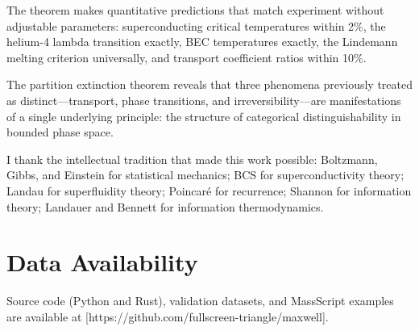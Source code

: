 \documentclass[twocolumn,10pt,aps,prd,superscriptaddress,nofootinbib]{revtex4-2}
\theoremstyle{remark}
\begin{document}
The theorem makes quantitative predictions that match experiment without adjustable parameters: superconducting critical temperatures within 2\%, the helium-4 lambda transition exactly, BEC temperatures exactly, the Lindemann melting criterion universally, and transport coefficient ratios within 10\%.

The partition extinction theorem reveals that three phenomena previously treated as distinct---transport, phase transitions, and irreversibility---are manifestations of a single underlying principle: the structure of categorical distinguishability in bounded phase space.

\begin{acknowledgments}
I thank the intellectual tradition that made this work possible: Boltzmann, Gibbs, and Einstein for statistical mechanics; BCS for superconductivity theory; Landau for superfluidity theory; Poincar\'{e} for recurrence; Shannon for information theory; Landauer and Bennett for information thermodynamics.
\end{acknowledgments}

\section*{Data Availability}

Source code (Python and Rust), validation datasets, and MassScript examples are available at [https://github.com/fullscreen-triangle/maxwell].


\end{document}
